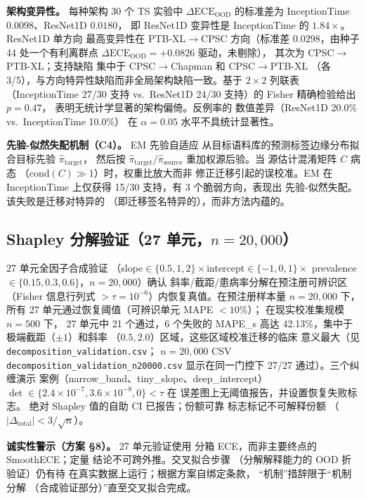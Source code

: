 \textbf{架构变异性。} 每种架构 30 个 TS 实验中
$\Delta\text{ECE}_{\text{OOD}}$ 的标准差为
InceptionTime $0.0098$、ResNet1D $0.0180$，
即 ResNet1D 变异性是 InceptionTime 的 $1.84\times$。ResNet1D 单方向
最高变异性在 PTB-XL$\rightarrow$CPSC
方向（标准差 $0.0298$，由种子 44 处一个有利离群点
$\Delta\text{ECE}_{\text{OOD}}=+0.0826$ 驱动，未剔除），
其次为 CPSC$\rightarrow$PTB-XL；支持缺陷
集中于 CPSC$\rightarrow$Chapman 和 CPSC$\rightarrow$PTB-XL
（各 3/5），与方向特异性缺陷而非全局架构缺陷一致。基于
$2\times2$ 列联表（InceptionTime 27/30 支持 vs.\
ResNet1D 24/30 支持）的 Fisher 精确检验给出 $p = 0.47$，
表明无统计学显著的架构偏倚。反例率的
数值差异（ResNet1D 20.0\% vs.\ InceptionTime 10.0\%）
在 $\alpha = 0.05$ 水平不具统计显著性。

\textbf{先验-似然失配机制（C4）。} EM 先验自适应
从目标语料库的预测标签边缘分布拟合目标先验 $\hat\pi_{\text{target}}$，
然后按 $\hat\pi_{\text{target}}/\hat\pi_{\text{source}}$ 重加权源后验。当
源估计混淆矩阵 $C$ 病态
（$\text{cond}(C)\gg 1$）时，权重比放大而非
修正迁移引起的误校准。EM 在 InceptionTime 上仅获得 15/30
支持，有 3 个脆弱方向，表现出
先验-似然失配。该失败是迁移对特异的
（即迁移签名特异的），而非方法内蕴的。

\subsection{Shapley 分解验证（27 单元，$n=20{,}000$）}
\label{sec:shapley}
27 单元全因子合成验证
（slope$\in\{0.5,1,2\}\times$intercept$\in\{-1,0,1\}\times$
prevalence$\in\{0.15,0.3,0.6\}$，$n=20{,}000$）确认
斜率/截距/患病率分解在预注册可辨识区（Fisher 信息行列式
$>\tau=10^{-6}$）内恢复真值。在预注册样本量 $n=20{,}000$ 下，
所有 27 单元通过恢复阈值（可辨识单元 MAPE $<10\%$）；
在现实校准集规模 $n=500$ 下，
27 单元中 21 个通过，6 个失败的 MAPE\_s 高达
42.13\%，集中于极端截距（$\pm 1$）和斜率
（$0.5, 2.0$）区域，这些区域校准迁移的临床
意义最大（见 \texttt{decomposition\_validation.csv}；
$n=20{,}000$ CSV \texttt{decomposition\_validation\_}\allowbreak\texttt{n20000.csv}
显示在同一门控下 27/27 通过）。三个纠缠演示
案例（narrow\_band、tiny\_slope、deep\_intercept）
$\det\in\{2.4\times10^{-7}, 3.6\times10^{-8}, 0\}<\tau$ 在
误差图上无阈值报告，并设置恢复失败标志。
绝对 Shapley 值的自助 CI 已报告；份额可靠
标志标记不可解释份额
（$|\Delta_{\text{total}}|<3/\sqrt{n}$）。

\textbf{诚实性警示（方案 \S8）。} 27 单元验证使用
分箱 ECE，而非主要终点的 SmoothECE；定量
结论不可跨外推。交叉拟合步骤
（分解解释能力的 OOD 折验证）仍有待
在真实数据上运行；根据方案自绑定条款，
``机制''措辞限于``机制分解
（合成验证部分）''直至交叉拟合完成。

